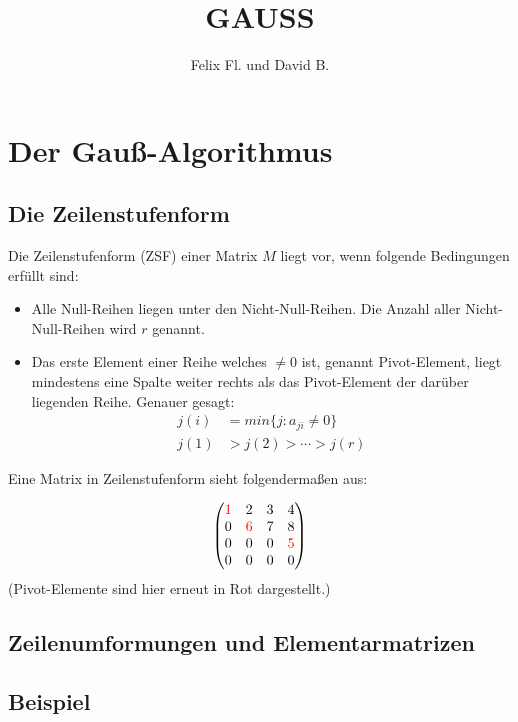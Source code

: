 \documentclass{scrartcl}
\title{GAUSS}
\author{Felix Fl. und David B.}
\begin{document}
\maketitle

\tableofcontents
\newpage

\section{Der Gauß-Algorithmus}


\subsection{Die Zeilenstufenform}
Die Zeilenstufenform (ZSF) einer Matrix $M$ liegt vor, wenn folgende Bedingungen erfüllt sind:
\begin{itemize}
\item Alle Null-Reihen liegen unter den Nicht-Null-Reihen. Die Anzahl aller Nicht-Null-Reihen wird $r$ genannt.
\item Das erste Element einer Reihe welches $\neq 0$ ist, genannt Pivot-Element, liegt mindestens eine Spalte weiter rechts als das Pivot-Element der darüber liegenden Reihe. Genauer gesagt: 
\begin{align*}
	j(i) & = min\{j: a_{ji} \neq 0 \} \\
	j(1) & > j(2) > \cdots > j(r)
\end{align*} 
\end{itemize}

Eine Matrix in Zeilenstufenform sieht folgendermaßen aus:

\[ \begin{pmatrix}{\color{red}1}
& 2 & 3 & 4\\ 
0 &{\color{red}6}& 7 & 8  \\ 
0 & 0 & 0 &{\color{red}5} \\ 
0 &0& 0 & 0\\ 
\end{pmatrix} \]
(Pivot-Elemente sind hier erneut in Rot dargestellt.)

\subsection{Zeilenumformungen und Elementarmatrizen}


\subsection{Beispiel}

\end{document}
